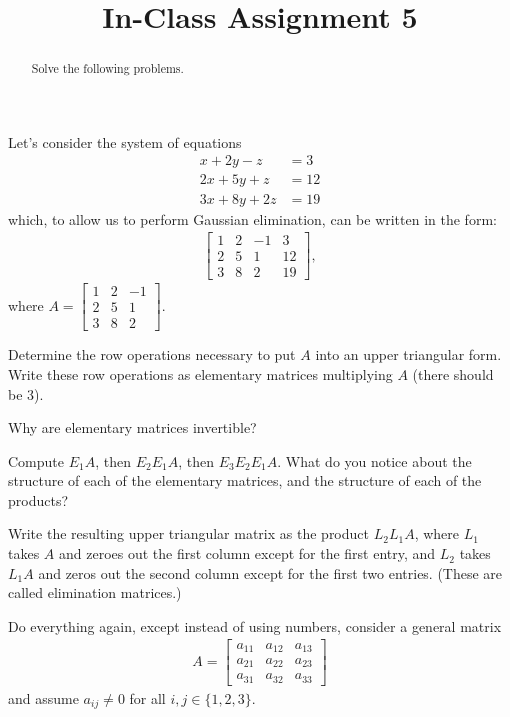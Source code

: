 \documentclass{ximera}
\begin{document}
    \title{In-Class Assignment 5}
    
    \begin{abstract} Solve the following problems.
    \end{abstract}
    \maketitle


Let's consider the system of equations 
\begin{align*}
    x+2y-z &= 3 \\
    2x+5y+z &=12 \\
    3x+8y+2z &=19
\end{align*}
which, to allow us to perform Gaussian elimination, can be written in the form:
\begin{align*}
\left[
\begin{array}{rrr|r}
1 & 2 & -1 & 3 \\
2 & 5 & 1 & 12 \\
3 & 8 & 2 & 19
\end{array}
\right],
\end{align*}
where $A = \begin{bmatrix} 1 & 2 & -1 \\
2 & 5 & 1 \\
3 & 8 & 2\end{bmatrix}$.

\begin{exercise}
    Determine the row operations necessary to put $A$ into an upper triangular form.  Write these row operations as elementary matrices multiplying $A$ (there should be 3).  
\end{exercise}
\vfill
\begin{exercise}
Why are elementary matrices invertible?
\end{exercise}
\newpage
\begin{exercise}
 Compute $E_1A$, then $E_2E_1A$, then $E_3E_2E_1A$.  What do you notice about the structure of each of the elementary matrices, and the structure of each of the products?
 \end{exercise}
 \vfill
 \begin{exercise}
 Write the resulting upper triangular matrix as the product $L_2L_1A$, where $L_1$ takes $A$ and zeroes out the first column except for the first entry, and $L_2$ takes $L_1A$ and zeros out the second column except for the first two entries.  (These are called elimination matrices.)
 \end{exercise}
\vfill
\newpage
 \begin{exercise}
Do everything again, except instead of using numbers, consider a general matrix 
    \begin{align*}
        A = \begin{bmatrix} a_{11} & a_{12} & a_{13} \\
        a_{21} & a_{22} & a_{23} \\
        a_{31} & a_{32} & a_{33}\end{bmatrix}
    \end{align*}
    and assume $a_{ij} \neq 0$ for all $i,j \in \{1,2,3\}$.
\end{exercise}
\end{document}
